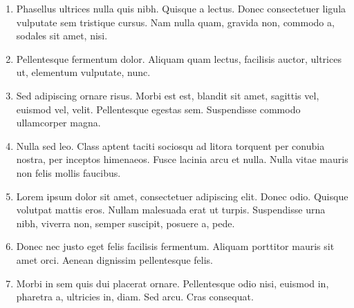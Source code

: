 \documentclass[a4paper]{article}
\newenvironment{steps}
{%
  \begin{enumerate}[leftmargin=0.3cm]
}
{%
  \end{enumerate}
}
\begin{document}
\begin{multicols}{3}
\begin{steps}
    \item{Phasellus ultrices nulla quis nibh. Quisque a lectus. Donec consectetuer ligula vulputate sem tristique cursus. Nam nulla quam, gravida non, commodo a, sodales sit amet, nisi.} %
    \item{Pellentesque fermentum dolor. Aliquam quam lectus, facilisis auctor, ultrices ut, elementum vulputate, nunc.} %
    \item{Sed adipiscing ornare risus. Morbi est est, blandit sit amet, sagittis vel, euismod vel, velit. Pellentesque egestas sem. Suspendisse commodo ullamcorper magna.} %
    \item{Nulla sed leo. Class aptent taciti sociosqu ad litora torquent per conubia nostra, per inceptos himenaeos.
          Fusce lacinia arcu et nulla. Nulla vitae mauris non felis mollis faucibus.} %
    \item{Lorem ipsum dolor sit amet, consectetuer adipiscing elit. Donec odio. Quisque volutpat mattis eros. Nullam malesuada erat ut turpis. Suspendisse urna nibh, viverra non, semper suscipit, posuere a, pede.} %
    \item{Donec nec justo eget felis facilisis fermentum. Aliquam porttitor mauris sit amet orci. Aenean dignissim pellentesque felis.} %
    \item{Morbi in sem quis dui placerat ornare. Pellentesque odio nisi, euismod in, pharetra a, ultricies in, diam. Sed arcu. Cras consequat.} %
  \end{steps}
\end{multicols}
\end{document}
